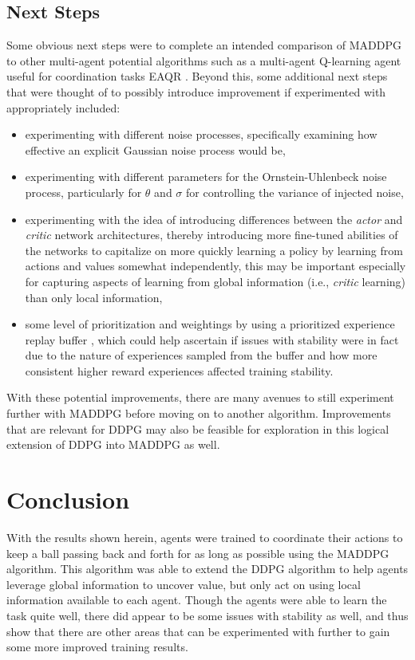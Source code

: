 \documentclass[11pt]{article}
\begin{document}
	\subsection{Next Steps}
	
	Some obvious next steps were to complete an intended comparison of MADDPG to other multi-agent potential algorithms such as a multi-agent Q-learning agent useful for coordination tasks EAQR \cite{eaqr}. Beyond this, some additional next steps that were thought of to possibly introduce improvement if experimented with appropriately included:
	\begin{itemize}
		\item experimenting with different noise processes, specifically examining how effective an explicit Gaussian noise process would be,
		\item experimenting with different parameters for the Ornstein-Uhlenbeck noise process, particularly for $\theta$ and $\sigma$ for controlling the variance of injected noise,
		\item experimenting with the idea of introducing differences between the \textit{actor} and \textit{critic} network architectures, thereby introducing more fine-tuned abilities of the networks to capitalize on more quickly learning a policy by learning from actions and values somewhat independently, this may be important especially for capturing aspects of learning from global information (i.e., \textit{critic} learning) than only local information,
		\item some level of prioritization and weightings by using a prioritized experience replay buffer \cite{prioritized}, which could help ascertain if issues with stability were in fact due to the nature of experiences sampled from the buffer and how more consistent higher reward experiences affected training stability.
	\end{itemize}
	
	With these potential improvements, there are many avenues to still experiment further with MADDPG before moving on to another algorithm. Improvements that are relevant for DDPG may also be feasible for exploration in this logical extension of DDPG into MADDPG as well.
	
	\section{Conclusion}
	
	With the results shown herein, agents were trained to coordinate their actions to keep a ball passing back and forth for as long as possible using the MADDPG algorithm. This algorithm was able to extend the DDPG algorithm to help agents leverage global information to uncover value, but only act on using local information available to each agent. Though the agents were able to learn the task quite well, there did appear to be some issues with stability as well, and thus show that there are other areas that can be experimented with further to gain some more improved training results.
	
\end{document}
